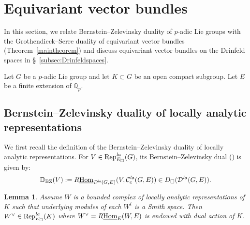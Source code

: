 \documentclass[a4paper,10pt]{amsart}
\theoremstyle{remark}
\theoremstyle{definition}
\theoremstyle{plain}
\newtheorem{lemma}[theorem]{Lemma}
\numberwithin{equation}{section}
\newcommand{\bbD}{{\mathbb D}}
\newcommand{\bbQ}{{\mathbb Q}}
\newcommand{\calC}{{\mathcal C}}
\newcommand{\calD}{{\mathcal D}}
\newcommand{\Hom}{{\rm Hom}}
\newcommand{\uHom}{\underline{\Hom}}
\newcommand{\la}{{\it la}}
\newcommand{\Rep}{{\rm Rep}}
\newcommand{\BZ}{\ensuremath{\mathrm{BZ}}}
\begin{document}
\section{Equivariant vector bundles}\label{sectionequivariantvectorbundle}
In this section, we relate Bernstein--Zelevinsky duality of $p$-adic Lie groups with the Grothendieck--Serre duality of equivariant vector bundles (Theorem~\ref{maintheorem}) and discuss equivariant vector bundles on the Drinfeld spaces in \S~\ref{subsec:Drinfeldspaces}. 

Let $G$ be a $p$-adic Lie group and let $K\subset G$ be an open compact subgroup. Let $E$ be a finite extension of $\bbQ_p$.
\subsection{Bernstein--Zelevinsky duality of locally analytic representations}
We first recall the definition of the Bernstein--Zelevinsky duality of locally analytic representations. For $V\in \Rep^{\la}_{E_\square}(G)$, its Bernstein--Zelevinsky dual (\cite[Def.~5.4]{strauch2025bernsteinzelevinskydualitylocallyanalytic}) is given by:
\begin{equation}\label{definitionBZdual}
	\bbD_{\BZ}(V):=R\uHom_{\calD^{\la}(G,E)}(V,\calC_c^{\la}(G,E))\in D_{\square}(\calD^{\la}(G,E)).
\end{equation}


\begin{lemma}\label{lemmadualla}
	Assume $W$ is a bounded complex of locally analytic representations of $K$ such that underlying modules of each $W^i$ is a Smith space. Then $W^\vee\in \Rep^{\la}_{E_\square}(K)$ where $W^\vee=R\underline{\Hom}_E(W,E)$ is endowed with dual action of $K$. 
\end{lemma}
\end{document}
